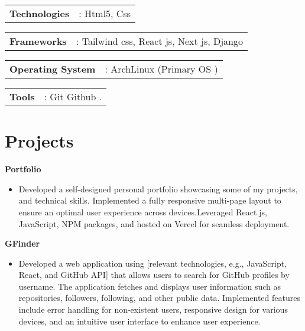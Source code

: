 \documentclass[a4paper,12pt]{article}
\begin{document}
\begin{tabularx}{\linewidth}{ @{}l r@{} }
\textbf{Technologies} & {: Html5, Css} \\[3.75pt]
\end{tabularx}

\begin{tabularx}{\linewidth}{ @{}l r@{} }
\textbf{Frameworks} & {: Tailwind css, React js, Next js, Django} \\[3.75pt]
\end{tabularx}

\begin{tabularx}{\linewidth}{ @{}l r@{} }
\textbf{Operating System} & {: ArchLinux (Primary OS )} \\[3.75pt]
\end{tabularx}

\begin{tabularx}{\linewidth}{ @{}l r@{} }
\textbf{Tools} & {: Git Github .} \\[3.75pt]
\end{tabularx}



\section{Projects}
\textbf{Portfolio}
\begin{itemize}
    \item Developed a self-designed personal portfolio showcasing some of my projects, and technical skills. Implemented a fully responsive multi-page layout to ensure an optimal user experience across devices.Leveraged React.js, JavaScript, NPM packages, and hosted on Vercel for seamless deployment.
\end{itemize}

\textbf{GFinder}
\begin{itemize}
    \item Developed a web application using [relevant technologies, e.g., JavaScript, React, and GitHub API] that allows users to search for GitHub profiles by username. The application fetches and displays user information such as repositories, followers, following, and other public data. Implemented features include error handling for non-existent users, responsive design for various devices, and an intuitive user interface to enhance user experience.
\end{itemize}
\end{document}
